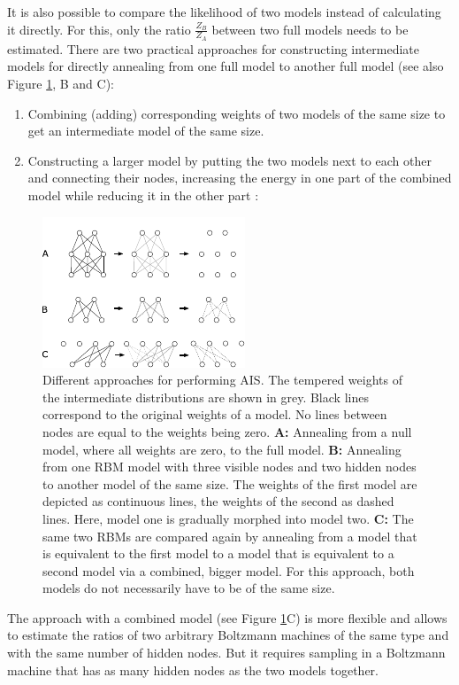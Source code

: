 \documentclass[12pt]{article}
\begin{document}
It is also possible to compare the likelihood of two models instead of calculating it directly.
For this, only the ratio $\frac{Z_B}{Z_A}$ between two full models needs to be estimated.
There are two practical approaches for constructing intermediate models  for directly annealing from one full model to another full model (see also Figure \ref{figTwotypesais}, B and C):
\begin{enumerate}
\item Combining (adding) corresponding weights of two models of the same size to get an intermediate model of the same size.
\item Constructing a larger model by putting the two models next to each other and connecting their nodes, increasing the energy in one part of the combined model while reducing it in the other part \citep{theis2011deepbelief}:
\end{enumerate}
\begin{figure}[h!]
\centering
\includegraphics[scale=3.5]{images/twotypesais.pdf}
\caption{Different approaches for performing AIS.
The tempered weights of the intermediate distributions are shown in grey. Black lines correspond to the original weights of a model. No lines between nodes are equal to the weights being zero.
{\bf A:} Annealing from a null model, where all weights are zero, to the full model.
{\bf B:} Annealing from one RBM model with three visible nodes and two hidden nodes to another model of the same size.
The weights of the first model are depicted as continuous lines, the weights of the second as dashed lines. Here, model one is gradually morphed into model two. {\bf C:}
The same two RBMs are compared again by annealing from a model that is equivalent to the first model to a model that is equivalent to a second model via a combined, bigger model. For this approach, both models do not necessarily have to be of the same size.}
\label{figTwotypesais}
\end{figure}
The approach with a combined model (see Figure \ref{figTwotypesais}C) is more flexible and allows to estimate the ratios of two arbitrary Boltzmann machines of the same type and with the same number of hidden nodes.
But it requires sampling in a Boltzmann machine that has as many hidden nodes as the two models together.
\end{document}
